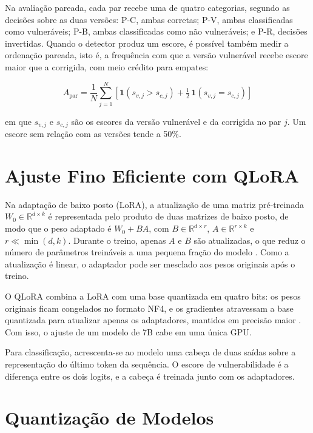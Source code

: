 Na avaliação pareada, cada par recebe uma de quatro categorias, segundo as decisões sobre as duas versões: P-C, ambas corretas; P-V, ambas classificadas como vulneráveis; P-B, ambas classificadas como não vulneráveis; e P-R, decisões invertidas. Quando o detector produz um escore, é possível também medir a ordenação pareada, isto é, a frequência com que a versão vulnerável recebe escore maior que a corrigida, com meio crédito para empates:

\begin{equation}
A_{\text{par}} = \frac{1}{N}\sum_{j=1}^{N}\left[\mathbf{1}(s_{v,j} > s_{c,j}) + \tfrac{1}{2}\,\mathbf{1}(s_{v,j} = s_{c,j})\right]
\end{equation}

em que $s_{v,j}$ e $s_{c,j}$ são os escores da versão vulnerável e da corrigida no par $j$. Um escore sem relação com as versões tende a 50\%.

\section{Ajuste Fino Eficiente com QLoRA}

Na adaptação de baixo posto (LoRA), a atualização de uma matriz pré-treinada $W_0 \in \mathbb{R}^{d \times k}$ é representada pelo produto de duas matrizes de baixo posto, de modo que o peso adaptado é $W_0 + BA$, com $B \in \mathbb{R}^{d \times r}$, $A \in \mathbb{R}^{r \times k}$ e $r \ll \min(d,k)$. Durante o treino, apenas $A$ e $B$ são atualizadas, o que reduz o número de parâmetros treináveis a uma pequena fração do modelo \cite{hu2021lora}. Como a atualização é linear, o adaptador pode ser mesclado aos pesos originais após o treino.

O QLoRA combina a LoRA com uma base quantizada em quatro bits: os pesos originais ficam congelados no formato NF4, e os gradientes atravessam a base quantizada para atualizar apenas os adaptadores, mantidos em precisão maior \cite{dettmers2023qlora}. Com isso, o ajuste de um modelo de 7B cabe em uma única GPU.

Para classificação, acrescenta-se ao modelo uma cabeça de duas saídas sobre a representação do último token da sequência. O escore de vulnerabilidade é a diferença entre os dois logits, e a cabeça é treinada junto com os adaptadores.

\section{Quantização de Modelos}

